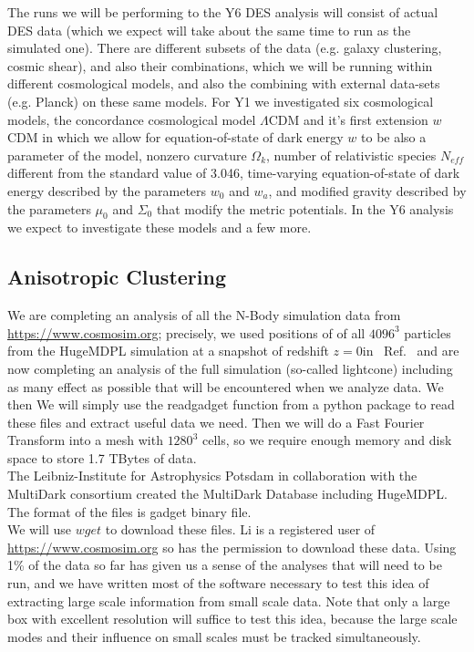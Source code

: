 \documentclass[12pt]{article}
\begin{document}
\begin{small}
The runs we will be performing to the Y6 DES analysis will consist of actual DES data (which we expect will take about the same time to run as the simulated one). There are different subsets of the data (e.g. galaxy clustering, cosmic shear), and also their combinations, which we will be running within different cosmological models, and also the combining with external data-sets (e.g. Planck) on these same models. For Y1 we investigated six cosmological models, the concordance cosmological model $\Lambda$CDM and it's first extension $w$CDM in which we allow for equation-of-state of dark energy $w$ to be also a parameter of the model, nonzero curvature $\Omega_k$,  number of relativistic species $N_{eff}$ different from the standard value of 3.046, time-varying equation-of-state of dark energy described by the parameters $w_0$ and $w_a$, and modified gravity described by the parameters $\mu_0$ and $\Sigma_0$ that modify the metric potentials. In the Y6 analysis we expect to investigate these models and a few more.



\subsection{Anisotropic Clustering}

We are completing an analysis of all the N-Body simulation data from \url{https://www.cosmosim.org}; precisely, we used positions of of all $4096^3$ particles from the HugeMDPL simulation at a snapshot of redshift $z=0$in ~Ref.~\cite{Li:2020uug} and are now completing an analysis of the full simulation (so-called lightcone) including as many effect as possible that will be encountered when we analyze data. We then 
We will simply use the readgadget function from a python package to read these files and extract useful data we need. Then we will do a Fast Fourier Transform into a mesh with $1280^3$ cells, so we require enough memory and disk space to store 1.7 TBytes of data.\\
The Leibniz-Institute for Astrophysics Potsdam in collaboration with the MultiDark consortium created the MultiDark Database including HugeMDPL. The format of the files is gadget binary file. \\
We will use $wget$ to download these files. Li is a registered user of \url{https://www.cosmosim.org} so has the permission to download these data. Using 1\% of the data so far has given us a sense of the analyses that will need to be run, and we have written most of the software necessary to test this idea of extracting large scale information from small scale data. Note that only a large box with excellent resolution will suffice to test this idea, because the large scale modes and their influence on small scales must be tracked simultaneously.%


\end{small}
\end{document}
